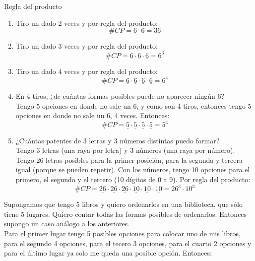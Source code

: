 \documentclass[../main.tex]{subfiles}
\begin{document}
\begin{defexamples} Regla del producto
    \begin{enumerate}
        \item Tiro un dado 2 veces y por regla del producto:
            \begin{equation*}
                \#CP = \underline{6}\cdot\underline{6} = 36
            \end{equation*}
        \item  Tiro un dado 3 veces y por regla del producto:
            \begin{equation*}
                \#CP = \underline{6}\cdot\underline{6}\cdot\underline{6} = 6^{3}
            \end{equation*}
        \item Tiro un dado 4 veces y por regla del producto:
            \begin{equation*}
                \#CP = \underline{6}\cdot\underline{6}\cdot\underline{6}\cdot\underline{6} = 6^{4}
            \end{equation*}
        \item En 4 tiros, ¿de cuántas formas posibles puede no aparecer ningún 6?\\
        Tengo 5 opciones en donde no sale un 6, y como son 4 tiros, entonces tengo 5 opciones en donde no sale un 6, 4 veces. Entonces:
            \begin{equation*}
                \#CP = \underline{5}\cdot\underline{5}\cdot\underline{5}\cdot\underline{5} = 5^{4}
            \end{equation*}
        \item ¿Cuántas patentes de 3 letras y 3 números distintas puedo formar?\\
        Tengo 3 letras (una raya por letra) y 3 números (una raya por número). Tengo 26 letras posibles para la primer posición, para la segunda y tercera igual (porque se pueden repetir). Con los números, tengo 10 opciones para el primero, el segundo y el tercero (10 dígitos de 0 a 9). Por regla del producto:
            \begin{equation*}
                \#CP = \underline{26}\cdot\underline{26}\cdot\underline{26}\cdot\underline{10}\cdot\underline{10}\cdot\underline{10} = 26^{3}\cdot10^{3}
            \end{equation*}
    \end{enumerate}
\end{defexamples}

Supongamos que tengo 5 libros y quiero ordenarlos en una biblioteca, que sólo tiene 5 lugares. Quiero contar todas las formas posibles de ordenarlos. Entonces supongo un caso análogo a los anteriores.\\
Para el primer lugar tengo 5 posibles opciones para colocar uno de mis libros, para el segundo 4 opciones, para el tecero 3 opciones, para el cuarto 2 opciones y para el último lugar ya solo me queda una posible opción. Entonces:
\end{document}
